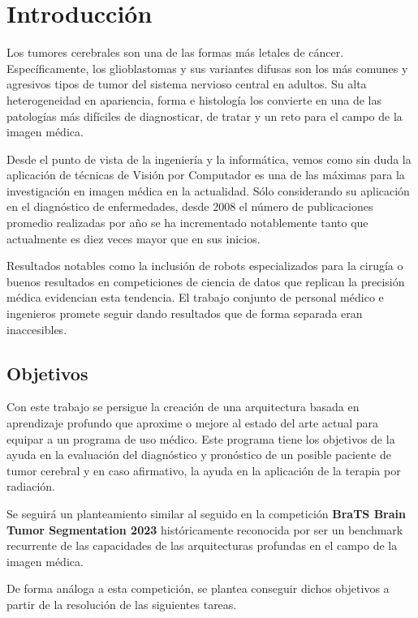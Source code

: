 \chapter{Introducción}

Los tumores cerebrales son una de las formas más letales de cáncer. Específicamente, los glioblastomas y sus variantes difusas son los más comunes y agresivos tipos de tumor del sistema nervioso central en adultos. Su alta heterogeneidad en apariencia, forma e histología los convierte en una de las patologías más difíciles de diagnosticar, de tratar y un reto para el campo de la imagen médica.

Desde el punto de vista de la ingeniería y la informática, vemos como sin duda la aplicación de técnicas de Visión por Computador es una de las máximas para la investigación en imagen médica en la actualidad. Sólo considerando su aplicación en el diagnóstico de enfermedades, desde 2008 el número de publicaciones promedio realizadas por año se ha incrementado notablemente tanto que actualmente es diez veces mayor que en sus inicios. 

Resultados notables como la inclusión de robots especializados para la cirugía \cite{DAVINCI} o buenos resultados en competiciones de ciencia de datos que replican la precisión médica \cite{PANDA} evidencian esta tendencia. El trabajo conjunto de personal médico e ingenieros promete seguir dando resultados que de forma separada eran inaccesibles.



\section{Objetivos}


Con este trabajo se persigue la creación de una arquitectura basada en aprendizaje profundo que aproxime o mejore al estado del arte actual para equipar a un programa de uso médico. Este programa tiene los objetivos de la ayuda en la evaluación del diagnóstico y pronóstico de un posible paciente de tumor cerebral y en caso afirmativo, la ayuda en la aplicación de la terapia por radiación. 

Se seguirá un planteamiento similar al seguido en la competición \textbf{BraTS Brain Tumor Segmentation 2023} \cite{BRATS2021} históricamente reconocida por ser un benchmark recurrente de las capacidades de las arquitecturas profundas en el campo de la imagen médica.
 
De forma análoga a esta competición, se plantea conseguir dichos objetivos a partir de la resolución de las siguientes tareas.

